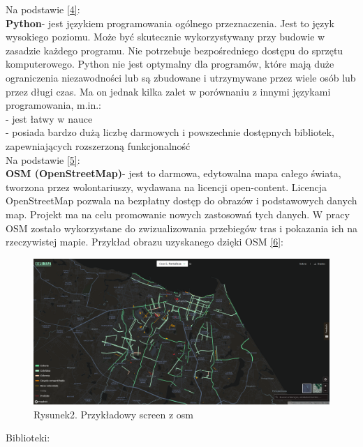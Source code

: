 \documentclass[a4paper, twoside, 12pt, justified]{article}
\begin{document}
	 Na podstawie \hyperlink{python}{[4]}:\\
	 \textbf{Python}- jest językiem programowania ogólnego przeznaczenia. Jest to język wysokiego poziomu. Może być skutecznie wykorzystywany przy budowie w zasadzie każdego programu. Nie potrzebuje bezpośredniego dostępu do sprzętu komputerowego. Python nie jest optymalny dla programów, które mają duże ograniczenia niezawodności lub są zbudowane i utrzymywane przez wiele osób lub przez długi czas. Ma on jednak kilka zalet w porównaniu z innymi językami programowania, m.in.:\\
	 - jest łatwy w nauce\\ 
	 - posiada bardzo dużą liczbę darmowych i powszechnie dostępnych bibliotek, zapewniających rozszerzoną funkcjonalność\\ 
	 
	 Na podstawie \hyperlink{osm}{[5]}:\\
	 \textbf{OSM (OpenStreetMap)}- jest to darmowa, edytowalna mapa całego świata, tworzona przez wolontariuszy, wydawana na licencji open-content. Licencja OpenStreetMap pozwala na bezpłatny dostęp do obrazów i podstawowych danych map. Projekt ma na celu promowanie nowych zastosowań tych danych. W pracy OSM zostało wykorzystane do zwizualizowania przebiegów tras i pokazania ich na rzeczywistej mapie. Przykład obrazu uzyskanego dzięki OSM \hyperlink{osm_example}{[6]}: \\
	 
 	\begin{figure}[h]
 	\includegraphics[scale=0.23]{osm_example}
 	\centering
 	\\
 	{Rysunek2. Przykładowy screen z osm}
	\end{figure}
	 
	 Biblioteki: \\
	 
	 
	 
	 
	
\end{document}
